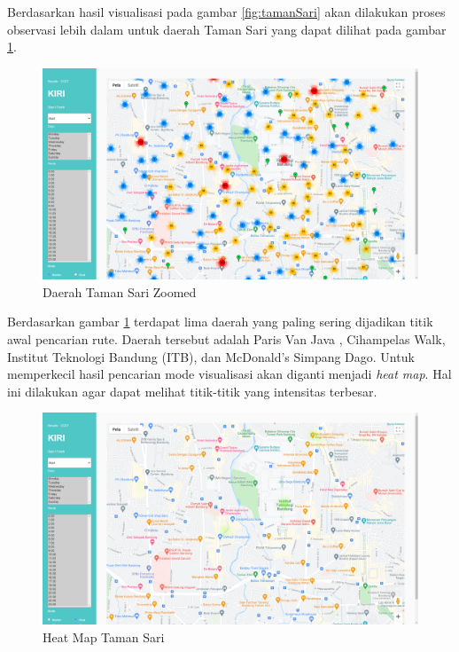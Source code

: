 Berdasarkan hasil visualisasi pada gambar \ref{fig:tamanSari} akan dilakukan proses observasi lebih dalam untuk daerah Taman Sari yang dapat dilihat pada gambar \ref{fig:tamanSariZoom}.
\begin{figure}[H]
	\centering  
	\includegraphics[scale=0.3]{Gambar/pengujian/taman-sari.png}  
	\caption[Daerah Taman Sari Zoomed]{Daerah Taman Sari Zoomed} 
	\label{fig:tamanSariZoom}
\end{figure}

Berdasarkan gambar \ref{fig:tamanSariZoom} terdapat lima daerah yang paling sering dijadikan titik awal pencarian rute. Daerah tersebut adalah   Paris Van Java , Cihampelas Walk, Institut Teknologi Bandung (ITB), dan McDonald's Simpang Dago. Untuk memperkecil hasil pencarian mode visualisasi akan diganti menjadi \textit{heat map}. Hal ini dilakukan agar dapat melihat titik-titik yang intensitas terbesar. 

\begin{figure}[H]
	\centering  
	\includegraphics[scale=0.3]{Gambar/pengujian/hasil-heat-map.png}  
	\caption[Heat Map Taman Sari]{Heat Map Taman Sari} 
	\label{fig:heatMapTamanSari}
\end{figure}

